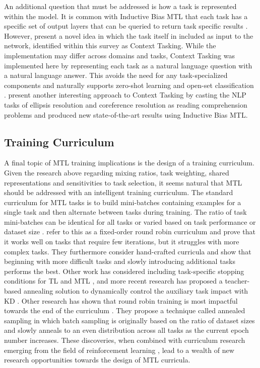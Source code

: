 \documentclass[twocolumn]{article}
\begin{document}
An additional question that must be addressed is how a task is represented within the model. It is common with Inductive Bias MTL that each task has a specific set of output layers that can be queried to return task specific results \citep{mtloverview17}. However, \cite{decanlp18} present a novel idea in which the task itself in included as input to the network, identified within this survey as Context Tasking. While the implementation may differ across domains and tasks, Context Tasking was implemented here by representing each task as a natural language question with a natural language answer. This avoids the need for any task-specialized components and naturally supports zero-shot learning and open-set classification \citep{openset14}. \cite{ellipsis19} present another interesting approach to Context Tasking by casting the NLP tasks of ellipsis resolution and coreference resolution as reading comprehension problems and produced new state-of-the-art results using Inductive Bias MTL.

\subsection{Training Curriculum}
A final topic of MTL training implications is the design of a training curriculum. Given the research above regarding mixing ratios, task weighting, shared representations and sensitivities to task selection, it seems natural that MTL should be addressed with an intelligent training curriculum. The standard curriculum for MTL tasks is to build mini-batches containing examples for a single task and then alternate between tasks during training. The ratio of task mini-batches can be identical for all tasks or varied based on task performance or dataset size \citep{mtl97,mts2sl15,mtloverview17,glue18}. \cite{decanlp18} refer to this as a fixed-order round robin curriculum and prove that it works well on tasks that require few iterations, but it struggles with more complex tasks. They furthermore consider hand-crafted curricula and show that beginning with more difficult tasks and slowly introducing additional tasks performs the best. Other work has considered including task-specific stopping conditions for TL and MTL \citep{howtrans16}, and more recent research has proposed a teacher-based annealing solution to dynamically control the auxiliary task impact with KD \citep{bam19}. Other research has shown that round robin training is most impactful towards the end of the curriculum \citep{bertandpals19}. They propose a technique called annealed sampling in which batch sampling is originally based on the ratio of dataset sizes and slowly anneals to an even distribution across all tasks as the current epoch number increases. These discoveries, when combined with curriculum research emerging from the field of reinforcement learning \citep{curriculum17}, lead to a wealth of new research opportunities towards the design of MTL curricula.
\end{document}
